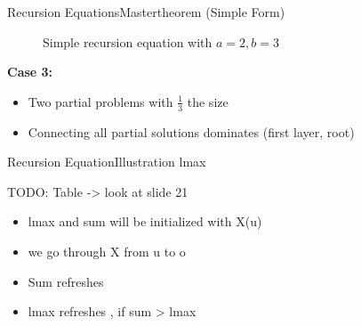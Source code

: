 %      


\begin{frame}{Recursion Equations}{Mastertheorem (Simple Form)}
  \begin{figure}[!h]
    \begin{adjustbox}{width=\linewidth}
      \def\AlgoREDivide{2}%
      \def\AlgoRESize{0.33}%
      \def\AlgoREScale{15}%
      
    \end{adjustbox}
    \caption{Simple recursion equation with {\color{Mittel-Blau}$a = 2, b = 3$}}
    \label{fig:recursion_equations:mastertheorem_tree_2_3}
  \end{figure}
  \textbf{Case 3:}
  \begin{itemize}
    \item
      Two partial problems with $\frac{1}{3}$ the size
    \item
      Connecting all partial solutions dominates (first layer, root)
  \end{itemize}
\end{frame}


\begin{frame}{Recursion Equation}{Illustration lmax}
    
    TODO: Table -> look at slide 21 \vspace{2em}
    
  \begin{itemize}
    \item
      lmax and sum will be initialized with X(u)
    \item
      we go through X from u to o
    \item
      Sum refreshes
    \item
      lmax refreshes , if sum > lmax
  \end{itemize}
\end{frame}

